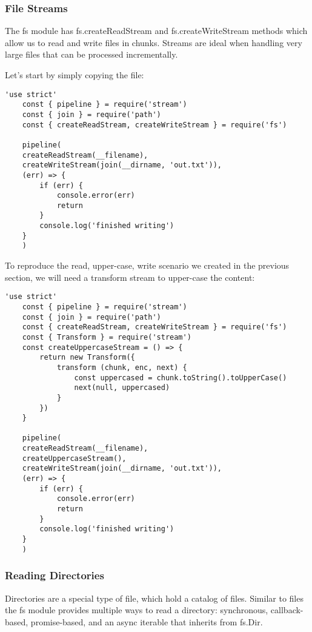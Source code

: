 \documentclass{scrartcl}
\begin{document}
\subsubsection{File Streams}

The fs module has fs.createReadStream and fs.createWriteStream methods which allow us to read and write files in chunks. Streams are ideal when handling very large files that can be processed incrementally.

Let's start by simply copying the file:

\begin{lstlisting}[style=ES6]
    'use strict'
    const { pipeline } = require('stream')
    const { join } = require('path')
    const { createReadStream, createWriteStream } = require('fs')

    pipeline(
    createReadStream(__filename),
    createWriteStream(join(__dirname, 'out.txt')),
    (err) => {
        if (err) {
            console.error(err)
            return
        }
        console.log('finished writing')
    }
    )
\end{lstlisting}

To reproduce the read, upper-case, write scenario we created in the previous section, we will need a transform stream to upper-case the content:

\begin{lstlisting}[style=ES6]
    'use strict'
    const { pipeline } = require('stream')
    const { join } = require('path')
    const { createReadStream, createWriteStream } = require('fs')
    const { Transform } = require('stream')
    const createUppercaseStream = () => {
        return new Transform({
            transform (chunk, enc, next) {
                const uppercased = chunk.toString().toUpperCase()
                next(null, uppercased)
            }
        })
    }

    pipeline(
    createReadStream(__filename),
    createUppercaseStream(),
    createWriteStream(join(__dirname, 'out.txt')),
    (err) => {
        if (err) {
            console.error(err)
            return
        }
        console.log('finished writing')
    }
    )
\end{lstlisting}

\subsubsection{Reading Directories}

Directories are a special type of file, which hold a catalog of files. Similar to files the fs module provides multiple ways to read a directory: synchronous, callback-based, promise-based, and an async iterable that inherits from fs.Dir.
\end{document}
